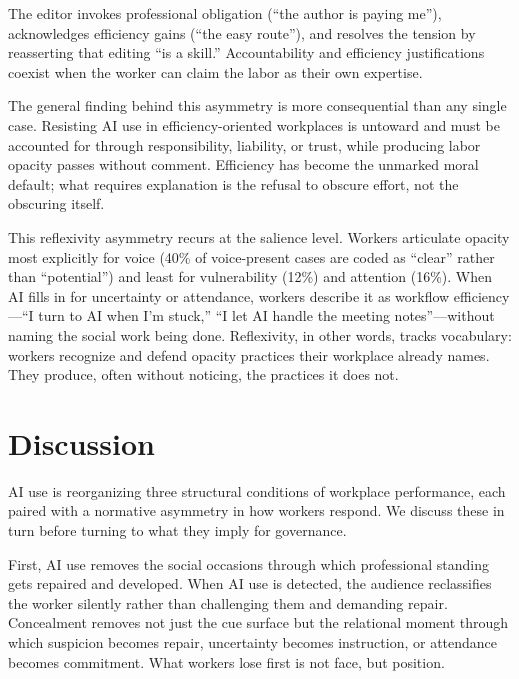\documentclass[pdflatex,sn-basic]{sn-jnl}%
\theoremstyle{thmstyleone}%
\theoremstyle{thmstyletwo}%
\theoremstyle{thmstylethree}%
\begin{document}
The editor invokes professional obligation (``the author is paying me''), acknowledges efficiency gains (``the easy route''), and resolves the tension by reasserting that editing ``is a skill.'' Accountability and efficiency justifications coexist when the worker can claim the labor as their own expertise.
 
The general finding behind this asymmetry is more consequential than any single case. Resisting AI use in efficiency-oriented workplaces is untoward and must be accounted for through responsibility, liability, or trust, while producing labor opacity passes without comment. Efficiency has become the unmarked moral default; what requires explanation is the refusal to obscure effort, not the obscuring itself.
 
This reflexivity asymmetry recurs at the salience level. Workers articulate opacity most explicitly for voice (40\% of voice-present cases are coded as ``clear'' rather than ``potential'') and least for vulnerability (12\%) and attention (16\%). When AI fills in for uncertainty or attendance, workers describe it as workflow efficiency---``I turn to AI when I'm stuck,'' ``I let AI handle the meeting notes''---without naming the social work being done. Reflexivity, in other words, tracks vocabulary: workers recognize and defend opacity practices their workplace already names. They produce, often without noticing, the practices it does not. 

\section{Discussion}

AI use is reorganizing three structural conditions of workplace performance, each paired with a normative asymmetry in how workers respond. We discuss these in turn before turning to what they imply for governance.
 
First, AI use removes the social occasions through which professional standing gets repaired and developed. When AI use is detected, the audience reclassifies the worker silently rather than challenging them and demanding repair. Concealment removes not just the cue surface but the relational moment through which suspicion becomes repair, uncertainty becomes instruction, or attendance becomes commitment. What workers lose first is not face, but position.
 
\end{document}
